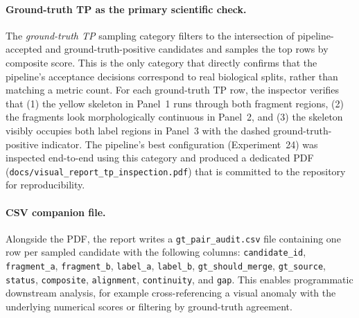 \paragraph{Ground-truth TP as the primary scientific check.}
The \emph{ground-truth TP} sampling category filters to the intersection of
pipeline-accepted and ground-truth-positive candidates and samples the top
rows by composite score. This is the only category that directly confirms
that the pipeline's acceptance decisions correspond to real biological
splits, rather than matching a metric count. For each ground-truth TP row,
the inspector verifies that (1) the yellow skeleton in Panel~1 runs through
both fragment regions, (2) the fragments look morphologically continuous in
Panel~2, and (3) the skeleton visibly occupies both label regions in Panel~3
with the dashed ground-truth-positive indicator.  The pipeline's best
configuration (Experiment~24) was inspected end-to-end using this category
and produced a dedicated PDF (\texttt{docs/visual\_report\_tp\_inspection.pdf})
that is committed to the repository for reproducibility.

\paragraph{CSV companion file.}
Alongside the PDF, the report writes a \texttt{gt\_pair\_audit.csv} file
containing one row per sampled candidate with the following columns:
\texttt{candidate\_id}, \texttt{fragment\_a}, \texttt{fragment\_b},
\texttt{label\_a}, \texttt{label\_b}, \texttt{gt\_should\_merge},
\texttt{gt\_source}, \texttt{status}, \texttt{composite}, \texttt{alignment},
\texttt{continuity}, and \texttt{gap}.  This enables programmatic downstream
analysis, for example cross-referencing a visual anomaly with the underlying
numerical scores or filtering by ground-truth agreement.
